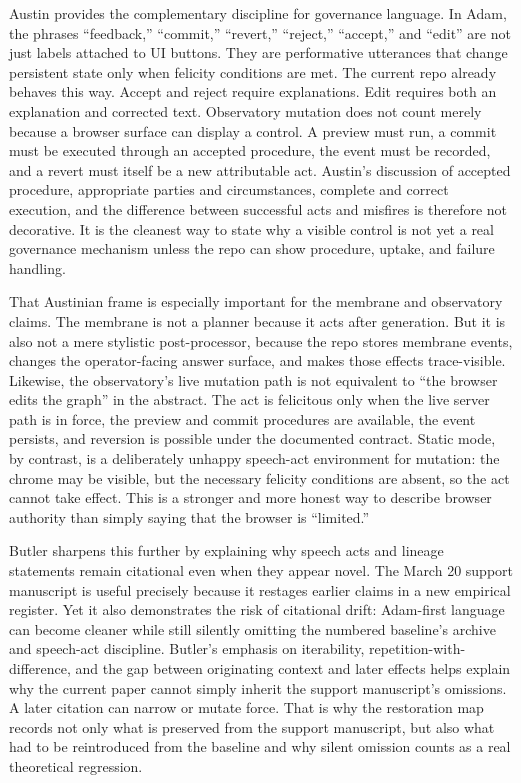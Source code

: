 \documentclass[10pt]{article}
\begin{document}
Austin provides the complementary discipline for governance language.\cite{austin1962} In Adam, the phrases ``feedback,'' ``commit,'' ``revert,'' ``reject,'' ``accept,'' and ``edit'' are not just labels attached to UI buttons. They are performative utterances that change persistent state only when felicity conditions are met. The current repo already behaves this way. Accept and reject require explanations. Edit requires both an explanation and corrected text. Observatory mutation does not count merely because a browser surface can display a control. A preview must run, a commit must be executed through an accepted procedure, the event must be recorded, and a revert must itself be a new attributable act. Austin's discussion of accepted procedure, appropriate parties and circumstances, complete and correct execution, and the difference between successful acts and misfires is therefore not decorative. It is the cleanest way to state why a visible control is not yet a real governance mechanism unless the repo can show procedure, uptake, and failure handling.

That Austinian frame is especially important for the membrane and observatory claims. The membrane is not a planner because it acts after generation. But it is also not a mere stylistic post-processor, because the repo stores membrane events, changes the operator-facing answer surface, and makes those effects trace-visible. Likewise, the observatory's live mutation path is not equivalent to ``the browser edits the graph'' in the abstract. The act is felicitous only when the live server path is in force, the preview and commit procedures are available, the event persists, and reversion is possible under the documented contract. Static mode, by contrast, is a deliberately unhappy speech-act environment for mutation: the chrome may be visible, but the necessary felicity conditions are absent, so the act cannot take effect. This is a stronger and more honest way to describe browser authority than simply saying that the browser is ``limited.''

Butler sharpens this further by explaining why speech acts and lineage statements remain citational even when they appear novel.\cite{butler1997} The March 20 support manuscript is useful precisely because it restages earlier claims in a new empirical register. Yet it also demonstrates the risk of citational drift: Adam-first language can become cleaner while still silently omitting the numbered baseline's archive and speech-act discipline. Butler's emphasis on iterability, repetition-with-difference, and the gap between originating context and later effects helps explain why the current paper cannot simply inherit the support manuscript's omissions. A later citation can narrow or mutate force. That is why the restoration map records not only what is preserved from the support manuscript, but also what had to be reintroduced from the baseline and why silent omission counts as a real theoretical regression.
\end{document}
